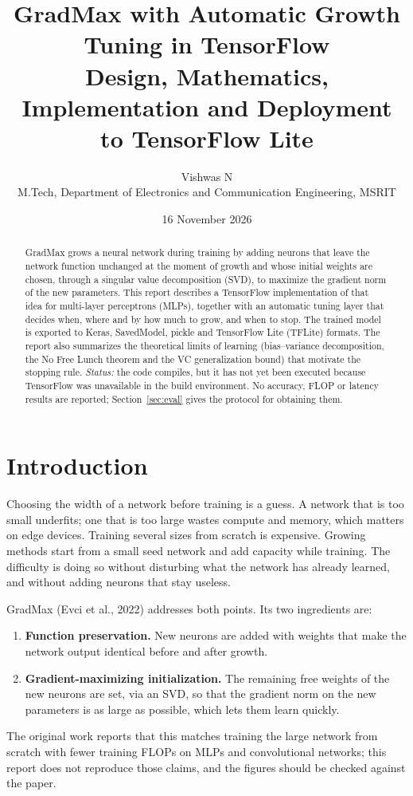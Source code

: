 \documentclass[11pt,a4paper]{article}
\title{GradMax with Automatic Growth Tuning in TensorFlow\\[2pt]
\large Design, Mathematics, Implementation and Deployment to TensorFlow Lite}
\author{Vishwas N\\ M.Tech, Department of Electronics and Communication Engineering, MSRIT}
\date{16 November 2026}
\begin{document}
\maketitle

\begin{abstract}
GradMax grows a neural network during training by adding neurons that leave the network function unchanged at the moment of growth and whose initial weights are chosen, through a singular value decomposition (SVD), to maximize the gradient norm of the new parameters. This report describes a TensorFlow implementation of that idea for multi-layer perceptrons (MLPs), together with an automatic tuning layer that decides when, where and by how much to grow, and when to stop. The trained model is exported to Keras, SavedModel, pickle and TensorFlow Lite (TFLite) formats. The report also summarizes the theoretical limits of learning (bias--variance decomposition, the No Free Lunch theorem and the VC generalization bound) that motivate the stopping rule. \emph{Status:} the code compiles, but it has not yet been executed because TensorFlow was unavailable in the build environment. No accuracy, FLOP or latency results are reported; Section~\ref{sec:eval} gives the protocol for obtaining them.
\end{abstract}

\tableofcontents
\newpage

\section{Introduction}
Choosing the width of a network before training is a guess. A network that is too small underfits; one that is too large wastes compute and memory, which matters on edge devices. Training several sizes from scratch is expensive. Growing methods start from a small seed network and add capacity while training. The difficulty is doing so without disturbing what the network has already learned, and without adding neurons that stay useless.

GradMax (Evci et al., 2022) addresses both points. Its two ingredients are:
\begin{enumerate}[nosep]
  \item \textbf{Function preservation.} New neurons are added with weights that make the network output identical before and after growth.
  \item \textbf{Gradient-maximizing initialization.} The remaining free weights of the new neurons are set, via an SVD, so that the gradient norm on the new parameters is as large as possible, which lets them learn quickly.
\end{enumerate}
The original work reports that this matches training the large network from scratch with fewer training FLOPs on MLPs and convolutional networks; this report does not reproduce those claims, and the figures should be checked against the paper.
\end{document}
